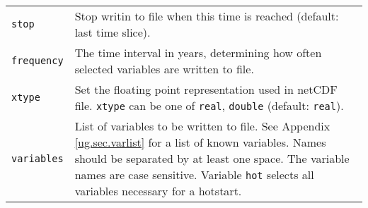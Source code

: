 \begin{center}
\begin{supertabular*}{\textwidth}{@{\extracolsep{\fill}}|l|p{11cm}|}
    \texttt{stop} & Stop writin to file when this time is reached (default: last time slice). \\
    \texttt{frequency} & The time interval in years, determining how often selected variables are written to file.\\
    \texttt{xtype} & Set the floating point representation used in netCDF file. \texttt{xtype} can be one of \texttt{real}, \texttt{double} (default: \texttt{real}). \\
    \texttt{variables} & List of variables to be written to file. See Appendix \ref{ug.sec.varlist} for a list of known variables. Names should be separated by at least one space. The variable names are case sensitive. Variable \texttt{hot} selects all variables necessary for a hotstart.\\
    \hline
  \end{supertabular*}
\end{center}
